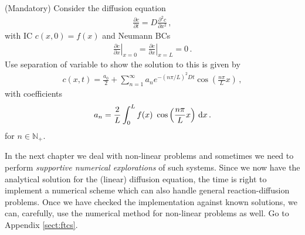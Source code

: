 \begin{exerciseregion}
	\begin{exercise} \label{expl:diffneumann}
		(Mandatory) Consider the diffusion equation
		\begin{eqnarray}
			\frac{\partial c}{\partial t} = D\frac{\partial^2c}{\partial x^2} \, , 
		\end{eqnarray}
		with IC $c(x,0)=f(x)$ and Neumann BCs
		\begin{eqnarray}
			\left.\frac{\partial c}{\partial x}\right|_{x=0}=\left.\frac{\partial c}{\partial x}\right|_{x=L}=0 \, .
		\end{eqnarray}
		Use separation of variable to show the solution to this is	given by
		\begin{eqnarray}
			c(x,t)=\frac{a_0}{2} + \sum_{n=1}^\infty a_n e^{-(n\pi/L)^2Dt}  
			\cos\left(\frac{n\pi}{L} x\right) \, ,
		\end{eqnarray}
		with coefficients
		\begin{eqnarray}
			a_n = \frac{2}{L}\int_0^Lf(x)\	\cos\left(\frac{n\pi}{L} x\right) \, \d x \, .
		\end{eqnarray}
		for $n \in \mathbb{N}_+$.
	\end{exercise}

	\begin{exploration}
		\label{exercise:numerics}
		In the next chapter we deal with non-linear problems and sometimes we need to  
		perform \emph{supportive numerical explorations} of such systems.  
		Since we now have the analytical solution for the (linear) diffusion equation, the time is right 
		to implement a numerical scheme which can also handle general reaction-diffusion problems. 
		Once we have checked the implementation against known solutions, we can,  
		carefully, use the numerical method for non-linear problems as well. Go to Appendix \ref{sect:ftcs}.
	\end{exploration}


\end{exerciseregion}

%
%

